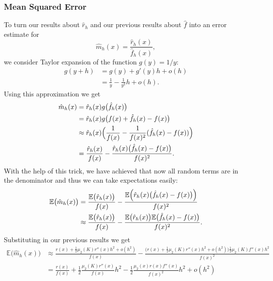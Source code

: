 \documentclass[
  a4paper,
]{article}
\theoremstyle{definition}
\theoremstyle{definition}
\theoremstyle{definition}
\theoremstyle{definition}
\theoremstyle{remark}
\begin{document}
\hypertarget{mean-squared-error-1}{%
\subsubsection*{Mean Squared Error}\label{mean-squared-error-1}}

To turn our results about \(\hat r_h\) and our previous results about
\(\hat f\) into an error estimate for
\begin{equation*}
  \hat m_h(x)
  = \frac{\hat r_h(x)}{\hat f_h(x)},
\end{equation*}
we consider Taylor expansion of the function \(g(y) = 1/y\):
\begin{align*}
  g(y + h)
  &= g(y) + g'(y) h + o(h) \\
  &= \frac1y - \frac{1}{y^2} h + o(h).
\end{align*}
Using this approximation we get
\begin{align*}
  \hat m_h(x)
  &= \hat r_h(x) g\bigl( \hat f_h(x) \bigr) \\
  &= \hat r_h(x) g\bigl( f(x) + \hat f_h(x) - f(x) \bigr) \\
  &\approx \hat r_h(x) \Bigl( \frac{1}{f(x)} - \frac{1}{f(x)^2} (\hat f_h(x) - f(x)) \Bigr) \\
  &= \frac{\hat r_h(x)}{f(x)} - \frac{\hat r_h(x) \bigl(\hat f_h(x) - f(x) \bigr)}{f(x)^2}.
\end{align*}
With the help of this trick, we have achieved that now all random terms
are in the denominator and thus we can take expectations easily:
\begin{align*}
  \mathbb{E}\bigl( \hat m_h(x) \bigr)
  &= \frac{\mathbb{E}\bigl( \hat r_h(x) \bigr)}{f(x)}
      - \frac{\mathbb{E}\Bigl( \hat r_h(x) \bigl(\hat f_h(x) - f(x) \bigr) \Bigr)}{f(x)^2} \\
  &\approx \frac{\mathbb{E}\bigl( \hat r_h(x) \bigr)}{f(x)}
      - \frac{\mathbb{E}\bigl( \hat r_h(x) \bigr) \mathbb{E}\bigl( \hat f_h(x) - f(x) \bigr)}{f(x)^2}.
\end{align*}
Substituting in our previous results we get
\begin{align*}
  \mathbb{E}\bigl( \hat m_h(x) \bigr)
  &\approx \frac{r(x) + \frac12 \mu_2(K) r''(x) h^2 + o(h^2)}{f(x)}
      - \frac{\bigl( r(x) + \frac12 \mu_2(K) r''(x) h^2 + o(h^2) \bigr)
          \frac12 \mu_2(K) f''(x) h^2}{f(x)^2} \\
  &= \frac{r(x)}{f(x)}
    + \frac12 \frac{\mu_2(K) r''(x)}{f(x)} h^2
    - \frac12 \frac{\mu_2(x) r(x) f''(x)}{f(x)^2} h^2
    + o(h^2)
\end{align*}
\end{document}
